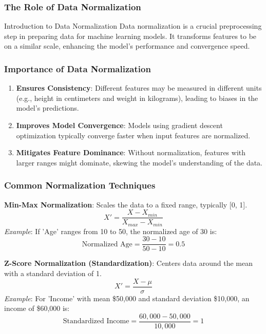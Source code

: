 \documentclass[aspectratio=169]{beamer}
\begin{document}
\begin{frame}
    \frametitle{The Role of Data Normalization}
    \begin{block}{Introduction to Data Normalization}
        Data normalization is a crucial preprocessing step in preparing data for machine learning models. It transforms features to be on a similar scale, enhancing the model's performance and convergence speed.
    \end{block}
\end{frame}

\begin{frame}
    \frametitle{Importance of Data Normalization}
    \begin{enumerate}
        \item \textbf{Ensures Consistency}: Different features may be measured in different units (e.g., height in centimeters and weight in kilograms), leading to biases in the model's predictions. 
        \item \textbf{Improves Model Convergence}: Models using gradient descent optimization typically converge faster when input features are normalized. 
        \item \textbf{Mitigates Feature Dominance}: Without normalization, features with larger ranges might dominate, skewing the model’s understanding of the data.
    \end{enumerate}
\end{frame}

\begin{frame}[fragile]
    \frametitle{Common Normalization Techniques}
    
    \textbf{Min-Max Normalization}: Scales the data to a fixed range, typically [0, 1].
    \begin{equation}
        X' = \frac{X - X_{min}}{X_{max} - X_{min}}
    \end{equation}
    \textit{Example}: 
    If 'Age' ranges from 10 to 50, the normalized age of 30 is:
    \begin{equation}
        \text{Normalized Age} = \frac{30 - 10}{50 - 10} = 0.5
    \end{equation}

    \textbf{Z-Score Normalization (Standardization)}: Centers data around the mean with a standard deviation of 1.
    \begin{equation}
        X' = \frac{X - \mu}{\sigma}
    \end{equation}
    \textit{Example}:
    For 'Income' with mean \$50,000 and standard deviation \$10,000, an income of \$60,000 is:
    \begin{equation}
        \text{Standardized Income} = \frac{60,000 - 50,000}{10,000} = 1
    \end{equation}
\end{frame}
\end{document}
